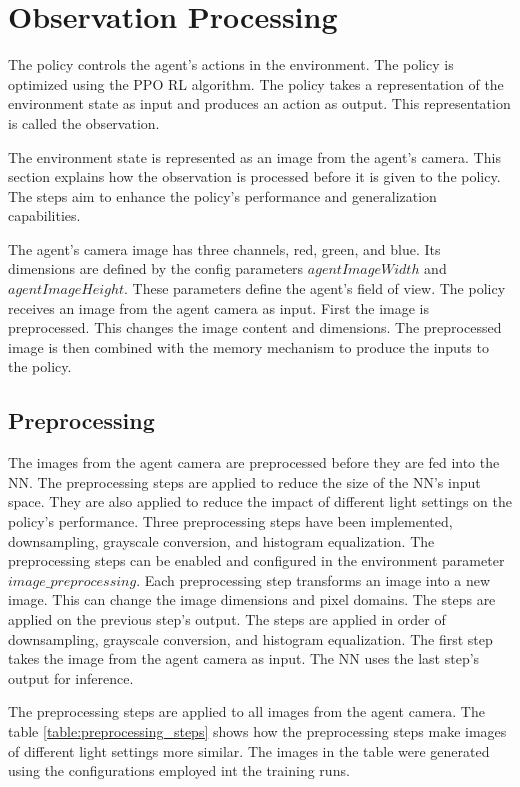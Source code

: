\section{Observation Processing}


The policy controls the agent's actions in the environment. The policy is optimized using the \ac{PPO} \ac{RL} algorithm. The policy takes a representation of the environment state as input and produces an action as output. This representation is called the observation.

The environment state is represented as an image from the agent's camera. This section explains how the observation is processed before it is given to the policy. The steps aim to enhance the policy's performance and generalization capabilities.

The agent's camera image has three channels, red, green, and blue. Its dimensions are defined by the config parameters $agentImageWidth$ and $agentImageHeight$. These parameters define the agent's field of view.
The policy receives an image from the agent camera as input. First the image is preprocessed. This changes the image content and dimensions. The preprocessed image is then combined with the memory mechanism to produce the inputs to the policy.


\subsection{Preprocessing}

The images from the agent camera are preprocessed before they are fed into the \ac{NN}. The preprocessing steps are applied to reduce the size of the \ac{NN}'s input space. They are also applied to reduce the impact of different light settings on the policy's performance.
Three preprocessing steps have been implemented, downsampling, grayscale conversion, and histogram equalization. The preprocessing steps can be enabled and configured in the environment parameter $image\_preprocessing$. Each preprocessing step transforms an image into a new image. This can change the image dimensions and pixel domains. The steps are applied on the previous step's output. The steps are applied in order of downsampling, grayscale conversion, and histogram equalization. The first step takes the image from the agent camera as input.
The \ac{NN} uses the last step's output for inference.

The preprocessing steps are applied to all images from the agent camera. The table \ref{table:preprocessing_steps} shows how the preprocessing steps make images of different light settings more similar. The images in the table were generated using the configurations employed int the training runs.


